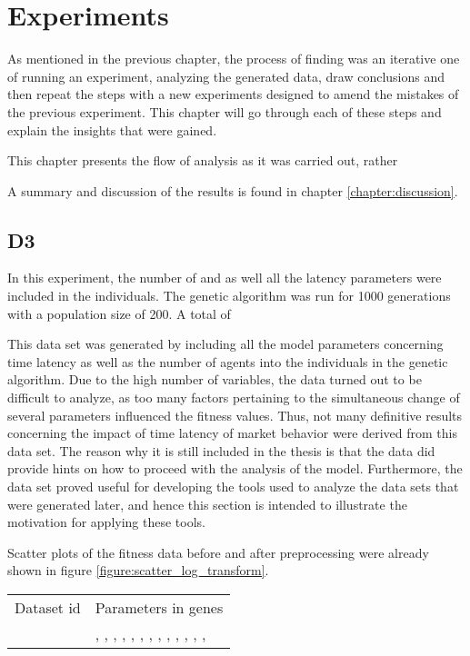 \chapter{Experiments}
As mentioned in the previous chapter, the process of finding was an iterative one of running an experiment, analyzing the generated data, draw conclusions and then repeat the steps with a new experiments designed to amend the mistakes of the previous experiment. This chapter will go through each of these steps and explain the insights that were gained.

This chapter presents the flow of analysis as it was carried out, rather 

A summary and discussion of the results is found in chapter \ref{chapter:discussion}.


\section{D3}
In this experiment, the number of \ssmmnAgents and \scnAgents as well all the latency parameters were included in the individuals. The genetic algorithm was run for 1000 generations with a population size of 200. A total of 


This data set was generated by including all the model parameters concerning time latency as well as the number of agents into the individuals in the genetic algorithm. Due to the high number of variables, the data turned out to be difficult to analyze, as too many factors pertaining to the simultaneous change of several parameters influenced the fitness values. Thus, not many definitive results concerning the impact of time latency of market behavior were derived from this data set. The reason why it is still included in the thesis is that the data did provide hints on how to proceed with the analysis of the model. Furthermore, the data set proved useful for developing the tools used to analyze the data sets that were generated later, and hence this section is intended to illustrate the motivation for applying these tools.

Scatter plots of the fitness data before and after preprocessing were already shown in figure \ref{figure:scatter_log_transform}.

\begin{table}
	\centering
	\begin{tabular}{l|l}
	Dataset id & Parameters in genes\\
	\dthree & \sclatencymu, \sclatencys, \scnAgents, \scthinkmu, \scthinks, \sctimehorizonmu, \sctimehorizons, \scwaitTimeBetweenTradingmu, \scwaitTimeBetweenTradings, \ssmmlatencymu, \ssmmlatencys, \ssmmnAgents, \ssmmthinkmu, \ssmmthinks	
	\end{tabular}
\end{table}

